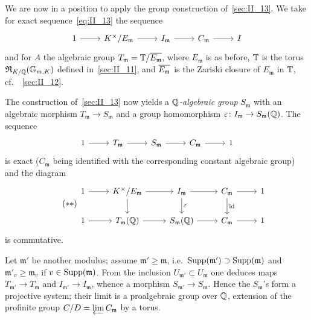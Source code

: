 We are now in a position to apply the group construction of~\ref{sec:II_13}.
We take for exact sequence~\eqref{eq:II_13} the sequence 
\[
	\begin{tikzcd}
		1 \arrow[r] & K^{\times} / E_\mathfrak{m} \arrow[r] & I_\mathfrak{m} 
		\arrow[r] & C_\mathfrak{m} \arrow[r] & I
	\end{tikzcd}
\]
and for $A$ the algebraic group $T_\mathfrak{m} = \mathbb{T} / \overline{E_\mathfrak{m}}$,%
where $E_\mathfrak{m}$ is as before, $\mathbb{T}$ is the torus $\operatorname{\mathfrak{R}}_{K/\mathbb{Q}}(
\mathbb{G}_{m, K})$ defined in~\ref{sec:II_11}, and $\overline{E_\mathfrak{m}}$ is the 
\dpage
Zariski closure of $E_\mathfrak{m}$ in $\mathbb{T}$, cf.\ ~\ref{sec:II_12}.

The construction of~\ref{sec:II_13} now yields a \emph{$\mathbb{Q}$-algebraic group} 
$S_\mathfrak{m}$ with an algebraic morphism $T_\mathfrak{m} \to S_\mathfrak{m}$ 
and a group homomorphism $\varepsilon\colon I_\mathfrak{m} \to S_\mathfrak{m}
(\mathbb{Q})$.
The sequence 
\[
\begin{tikzcd}
	1 \arrow[r] & T_\mathfrak{m} \arrow[r] & S_\mathfrak{m} \arrow[r] &
	C_\mathfrak{m} \arrow[r] & 1
\end{tikzcd}
\]
is exact ($C_\mathfrak{m}$ being identified with the corresponding constant 
algebraic group) and the diagram 
\begin{equation}\tag{$**$}\label{eq:II_22}
	\begin{tikzcd}
		1 \arrow[r] & K^\times / E_\mathfrak{m} \arrow[r] \arrow[d] & 
		I_\mathfrak{m} \arrow[r] \arrow[d, "\varepsilon"] & C_\mathfrak{m} 
		\arrow[r] \arrow[d, "\id"] & 1 \\
		1 \arrow[r] & T_\mathfrak{m}(\Q) \arrow[r] & S_\mathfrak{m}
		(\Q) \arrow[r] & C_\mathfrak{m} \arrow[r] & 1
	\end{tikzcd}
\end{equation}
is commutative.

\begin{obs}
Let $\mathfrak{m}'$ be another modulus; assume $\mathfrak{m}' \geq \mathfrak{m}
$, i.e.\ $\operatorname{Supp}(\mathfrak{m}') \supset \operatorname{Supp}(\mathfrak{m})$ and 
$\mathfrak{m}'_v \geq \mathfrak{m}_v$ if $v \in \operatorname{Supp}(\mathfrak{m})$. From the  
inclusion $U_{\mathfrak{m}'} \subset U_\mathfrak{m}$ one deduces maps $T_{
\mathfrak{m}'} \to T_\mathfrak{m}$ and $I_{\mathfrak{m}'} \to I_\mathfrak{m}$,
whence a morphism $S_{\mathfrak{m}'} \to S_\mathfrak{m}$. Hence the 
$S_\mathfrak{m}$'s form a projective system; their limit is a proalgebraic 
group over $\mathbb{Q}$, extension of the profinite group $C/D = \varprojlim
C_{\mathfrak{m}}$ by a torus.
\end{obs}


